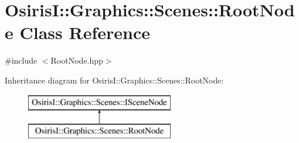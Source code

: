 \hypertarget{class_osiris_i_1_1_graphics_1_1_scenes_1_1_root_node}{\section{Osiris\-I\-:\-:Graphics\-:\-:Scenes\-:\-:Root\-Node Class Reference}
\label{class_osiris_i_1_1_graphics_1_1_scenes_1_1_root_node}
}


{\ttfamily \#include $<$Root\-Node.\-hpp$>$}

Inheritance diagram for Osiris\-I\-:\-:Graphics\-:\-:Scenes\-:\-:Root\-Node\-:\begin{figure}[H]
\begin{center}
\leavevmode
\includegraphics[height=2.000000cm]{class_osiris_i_1_1_graphics_1_1_scenes_1_1_root_node}
\end{center}
\end{figure}
